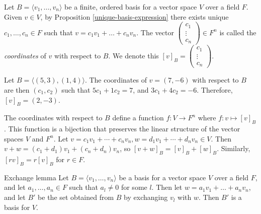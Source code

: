 \documentclass[12pt]{article}
\begin{document}
\begin{defn}
    Let $B = \langle v_1, \ldots, v_n\rangle$ be a finite, ordered basis for a vector space $V$ over a field $F$. Given $v \in V$, by Proposition \ref{unique-basis-expression} there exists unique $c_1, \ldots, c_n \in F$ such that $v = c_1v_1 + \ldots + c_nv_n$. The vector $\begin{pmatrix}c_1 \\ \vdots \\ c_n\end{pmatrix} \in F^n$ is called the \emph{coordinates} of $v$ with respect to $B$. We denote this $[v]_B = \begin{pmatrix}c_1 \\ \vdots \\ c_n\end{pmatrix}$.
\end{defn}

\begin{exmp}
    Let $B = \langle (5, 3), (1, 4)\rangle$. The coordinates of $v = (7, -6)$ with respect to $B$ are then $(c_1, c_2)$ such that $5c_1 + 1c_2 = 7$, and $3c_1 + 4c_2 = -6$. Therefore, $[v]_B = (2, -3)$.
\end{exmp}

\begin{rmk}
    The coordinates with respect to $B$ define a function $f: V \to F^n$ where $f: v \mapsto [v]_B$. This function is a bijection that preserves the linear structure of the vector spaces $V$ and $F^n$. Let $v = c_1v_1 + \cdots + c_nv_n, w = d_1v_1 + \cdots + d_nv_n \in V$. Then $v + w = (c_1 + d_1)v_1 + (c_n + d_n)v_n$, so $[v+w]_B = [v]_B + [w]_B$. Similarly, $[rv]_B = r[v]_B$ for $r \in F$.
\end{rmk}

\begin{lemma}{Exchange lemma}\label{exchange-lemma}\proofbreak
    Let $B = \langle v_1, \ldots, v_n \rangle$ be a basis for a vector space $V$ over a field $F$, and let $a_1, \ldots, a_n \in F$ such that $a_l \neq 0$ for some $l$. Then let $w = a_1v_1 + \ldots + a_nv_n$, and let $B'$ be the set obtained from $B$ by exchanging $v_l$ with $w$. Then $B'$ is a basis for $V$.
\end{lemma}
\end{document}
